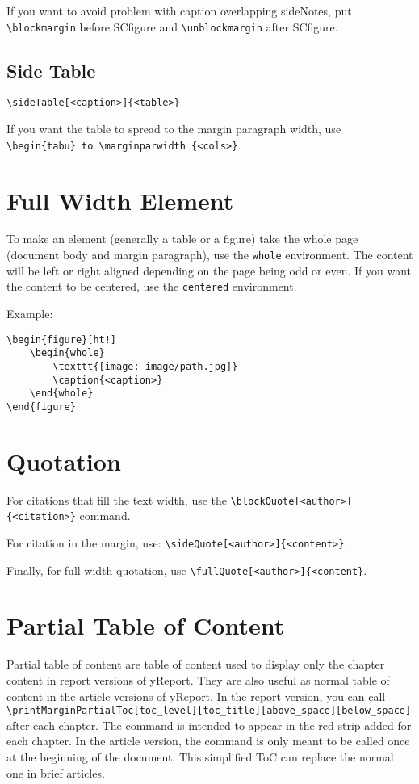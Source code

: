 \documentclass[a4paper, 11pt, oneside, fleqn]{article}
\begin{document}
	If you want to avoid problem with caption overlapping sideNotes, put \lstinline[breaklines]|\blockmargin| before SCfigure and \lstinline[breaklines]|\unblockmargin| after SCfigure.
	
	\subsection{Side Table}
	\lstinline[breaklines]|\sideTable[<caption>]{<table>}|
	
	If you want the table to spread to the margin paragraph width, use \lstinline[breaklines]|\begin{tabu} to \marginparwidth {<cols>}|.
	
	\section{Full Width Element}
	To make an element (generally a table or a figure) take the whole page (document body and margin paragraph), use the \lstinline[breaklines]|whole| environment. The content will be left or right aligned depending on the page being odd or even. If you want the content to be centered, use the \lstinline[breaklines]|centered| environment.
	
	Example:
	\begin{lstlisting}
\begin{figure}[ht!]
	\begin{whole}
		\texttt{[image: image/path.jpg]}
		\caption{<caption>}
	\end{whole}
\end{figure}
	\end{lstlisting}

	\section{Quotation}
	For citations that fill the text width, use the \lstinline|\blockQuote[<author>]{<citation>}| command.
	
	For citation in the margin, use: \lstinline|\sideQuote[<author>]{<content>}|.
	
	Finally, for full width quotation, use \lstinline|\fullQuote[<author>]{<content}|.
	
	\section{Partial Table of Content}
	Partial table of content are table of content used to display only the chapter content in report versions of yReport. They are also useful as normal table of content in the article versions of yReport. In the report version, you can call \lstinline[breaklines]|\printMarginPartialToc[toc_level][toc_title][above_space][below_space]| after each chapter. The command is intended to appear in the red strip added for each chapter. In the article version, the command is only meant to be called once at the beginning of the document. This simplified ToC can replace the normal one in brief articles.
	
\end{document}
